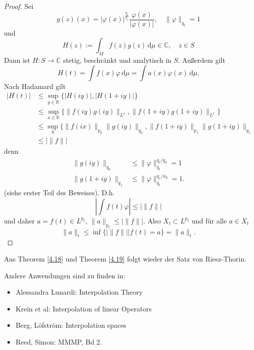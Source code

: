 \documentclass[
paper=a4,
bibtotocnumbered,
liststotocnumbered,
tablecaptionabove,
pointlessnumbers,
twoside,
openright,
10pt
]
{report}
\let\phi\varphi
\theoremstyle{definition}
\numberwithin{equation}{chapter}
\begin{document}
\begin{proof}
Sei
\begin{equation}
g(z) (x) = |\phi(x)|^{\frac{q_t}{q_z}} \frac{\phi(x)}{|\phi(x)|}, \quad \| \phi\|_{q_t} =1
\end{equation}
und
\begin{equation}
H(z) := \int_{M} f(z) g(z) \, \mathrm d\mu\in \mathbb C, \quad z\in S
\end{equation}
Dann ist $H:S\to \mathbb C$ stetig, beschränkt und analytisch in $S$. Außerdem gilt
\begin{equation}
H(t) = \int f(x) \phi \, \mathrm d\mu = \int a(x) \phi(x) \, \mathrm d\mu.
\end{equation}
Nach Hadamard gilt
\begin{align*}
|H(t)| &\le \sup_{y\in \mathbb R} \{ | H(iy)|, |H(1+iy)|\}\\
&\le \sup_{x\in \mathbb R} \{ \| f(iy) g(iy)\|_{L^1}, \| f(1+iy) g(1+iy)\|_{L^1} \}\\
&\le \sup_y \{ \| f(ix)\|_{p_0} \| g(iy)\|_{q_0}, \| f(1+iy)\|_{p_1} \| g(1+iy)\|_{q_1}\\
&\le |\| f\| |
\end{align*}
denn 
\begin{align*}
\| g(iy)\|_{q_0} &\le \| \phi\|_{q_t}^{q_t/q_0} =1\\
\| g(1+iy)\|_{q_1} &\le \| \phi\|_{q_t}^{q_1/a_q} =1.
\end{align*}
(siehe erster Teil des Beweises). D.h.
\begin{equation}
\left | \int f(t) \phi \right |\le |\| f\| |
\end{equation}
und daher $a= f(t) \in L^{p_t}$, $\| a\|_{p_t} \le |\| f\| |$. Also $X_t\subset L^{p_t}$ und für alle $a\in X_t$
\begin{equation}
\| a\|_t \le \inf\{|\| f\|| | f(t) = a\} = \| a\|_t.
\end{equation}
\end{proof}
Aus Theorem \ref{4.18} und Theorem \ref{4.19} folgt wieder der Satz von Riesz-Thorin.

Andere Anwendungen sind zu finden in:
\begin{itemize}
\item Alessandra Lunardi: Interpolation Theory
\item Krein et al: Interpolation of linear Operators
\item Berg, Löfström: Interpolation spaces
\item Reed, Simon: MMMP, Bd 2.
\end{itemize}
\end{document}
